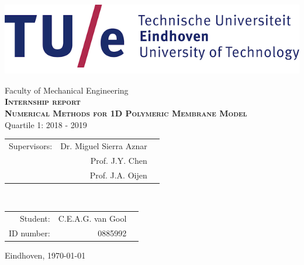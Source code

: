 \begin{titlepage}
\centering
\includegraphics[scale=0.5]{Images/TUE-logo.png}
\begin{center}
	\vspace{20mm}
	{\Large Faculty of Mechanical Engineering}\\
	\vspace{10mm}
	{\bf \textsc{\LARGE Internship report}}\\[5mm]
	{\bf \textsc{\LARGE Numerical Methods for 1D Polymeric Membrane Model}}\\[5mm]
	{\Large Quartile 1: 2018 - 2019}\\[15mm]

\end{center}
\begin{center}

\vspace{3cm}
\begin{tabular}{rrl} 
	\normalsize \textsf{Supervisors:}\normalsize \textsf{ }  & \normalsize \textsf{Dr. Miguel Sierra Aznar} &\normalsize \textsf{  }\\
	\normalsize \textsf{ } \normalsize \textsf{ }  & \normalsize \textsf{Prof. J.Y. Chen} &\normalsize \textsf{  }\\
	\normalsize \textsf{ } \normalsize \textsf{ }  & \normalsize \textsf{Prof. J.A. Oijen} &\normalsize \textsf{  }\\	
\end{tabular}\\
\vspace{1.5cm}

\begin{tabular}{rrl}
	\normalsize  \normalsize \textsf{Student: }  &\normalsize \textsf{C.E.A.G. van Gool} &\normalsize \textsf{}\\
	\normalsize  \normalsize \textsf{ID number: }  &\normalsize \textsf{0885992} &\normalsize \textsf{}\\
\end{tabular}
\end{center}

\vfill
\hfill Eindhoven, \today\\

\end{titlepage}

